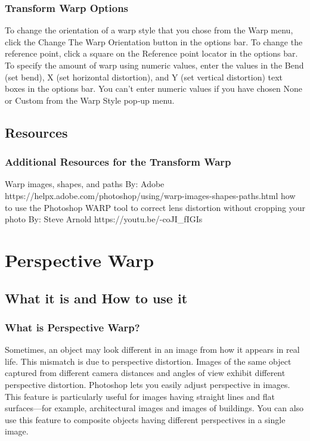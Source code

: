\documentclass{beamer}
\begin{document}
\begin{frame}
	\frametitle{Transform Warp Options}
	\begin{outline}
		\1 To change the orientation of a warp style that you chose from the Warp menu, click the Change The Warp Orientation button in the options bar.
		\1 To change the reference point, click a square on the Reference point locator in the options bar.
		\1 To specify the amount of warp using numeric values, enter the values in the Bend (set bend), X (set horizontal distortion), and Y (set vertical distortion) text boxes in the options bar. 
		\2 You can’t enter numeric values if you have chosen None or Custom from the Warp Style pop‑up menu.
	\end{outline}
\end{frame}

\subsection{Resources}		
	\begin{frame}
		\frametitle{Additional Resources for the Transform Warp}
		\begin{outline}
			\1 Warp images, shapes, and paths
			\2 By:  Adobe
			\2 https://helpx.adobe.com/photoshop/using/warp-images-shapes-paths.html
			\1 how to use the Photoshop WARP tool to correct lens distortion without cropping your photo
			\2  By:  Steve Arnold
			\2 https://youtu.be/-coJI\_fIGIs
		\end{outline}
	\end{frame}


\section{Perspective Warp}

\subsection{What it is and How to use it}		

\begin{frame}
	\frametitle{What is Perspective Warp?}
	\begin{outline}
		\1 Sometimes, an object may look different in an image from how it appears in real life. 
		\2 This mismatch is due to perspective distortion. 
		\2 Images of the same object captured from different camera distances and angles of view exhibit different perspective distortion.
		\1 Photoshop lets you easily adjust perspective in images. 
		\1 This feature is particularly useful for images having straight lines and flat surfaces—for example, architectural images and images of buildings. 
		\1 You can also use this feature to composite objects having different perspectives in a single image.
	\end{outline}
\end{frame}
\end{document}
